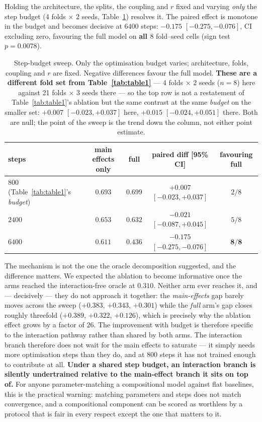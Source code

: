 \documentclass{article}
\newcommand{\tabonelabel}{tab:table1}
\begin{document}
Holding the architecture, the splits, the coupling and $r$ fixed and varying \emph{only} the
step budget (4 folds $\times$ 2 seeds, Table~\ref{tab:budget}) resolves it. The paired effect
is monotone in the budget and becomes decisive at $6400$ steps: $-0.175$ $[-0.275, -0.076]$,
CI excluding zero, favouring the full model on \textbf{all $8$} fold--seed cells (sign test
$p=0.0078$).

\begin{table}[h]
\centering
\caption{Step-budget sweep. Only the optimisation budget varies; architecture, folds,
coupling and $r$ are fixed. Negative differences favour the full model. \textbf{These are a
different fold set from Table~\ref{\tabonelabel}} --- 4 folds $\times$ 2 seeds ($n=8$) here
against 21 folds $\times$ 3 seeds there --- so the top row is not a restatement of
Table~\ref{\tabonelabel}'s ablation but the same contrast at the same \emph{budget} on the
smaller set: $+0.007$ $[-0.023, +0.037]$ here, $+0.015$ $[-0.024, +0.051]$ there. Both are
null; the point of the sweep is the trend down the column, not either point estimate.}
\label{tab:budget}
\begin{tabular}{lcccc}
\toprule
steps & main effects only & full & paired diff [95\% CI] & favouring full \\
\midrule
$800$ (Table~\ref{\tabonelabel}'s \emph{budget}) & $0.693$ & $0.699$ & $+0.007$ $[-0.023, +0.037]$ & $2/8$ \\
$2400$ & $0.653$ & $0.632$ & $-0.021$ $[-0.087, +0.045]$ & $5/8$ \\
$6400$ & $0.611$ & $\mathbf{0.436}$ & $\mathbf{-0.175}$ $[-0.275, -0.076]$ & $\mathbf{8/8}$ \\
\bottomrule
\end{tabular}
\end{table}

The mechanism is not the one the oracle decomposition suggested, and the difference matters.
We expected the ablation to become informative once the arms reached the interaction-free
oracle at $0.310$. Neither arm ever reaches it, and --- decisively --- they do not approach
it together: the \emph{main-effects} gap barely moves across the sweep ($+0.383$, $+0.343$,
$+0.301$) while the \emph{full} arm's gap closes roughly threefold
($+0.389$, $+0.322$, $+0.126$), which is precisely why the ablation effect grows by a
factor of $26$. The improvement with budget is therefore specific to the interaction
pathway rather than shared by both arms.
The interaction branch therefore does not wait for the main effects to saturate --- it simply
needs more optimisation steps than they do, and at $800$ steps it has not trained enough to
contribute at all. \textbf{Under a shared step budget, an interaction branch is silently
undertrained relative to the main-effect branch it sits on top of.} For anyone
parameter-matching a compositional model against flat baselines, this is the practical
warning: matching parameters and steps does not match convergence, and a compositional
component can be scored as worthless by a protocol that is fair in every respect except
the one that matters to it.
\end{document}
